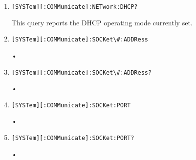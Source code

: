 \documentclass[a4paper,10pt]{article}
\begin{document}
\begin{enumerate}
\begin{enumerate}
\begin{description}
		    \end{description}
		\item 
		    \begin{verbatim}[SYSTem][:COMMunicate]:NETwork:DHCP?\end{verbatim}
		    \begin{description}
		        This query reports the DHCP operating mode currently set.
		    \end{description}
		\item 
		    \begin{verbatim}[SYSTem][:COMMunicate]:SOCKet\#:ADDRess\end{verbatim}
		    \begin{description}
		        •
		    \end{description}
		\item 
		    \begin{verbatim}[SYSTem][:COMMunicate]:SOCKet\#:ADDRess?\end{verbatim}
		    \begin{description}
		        •
		    \end{description}
		\item
		    \begin{verbatim}[SYSTem][:COMMunicate]:SOCKet:PORT\end{verbatim}
		    \begin{description}
		        •
		    \end{description}
		\item 
		    \begin{verbatim}[SYSTem][:COMMunicate]:SOCKet:PORT?\end{verbatim}
		    \begin{description}
		        •
		    \end{description}



\end{enumerate}
\end{enumerate}
\end{document}
